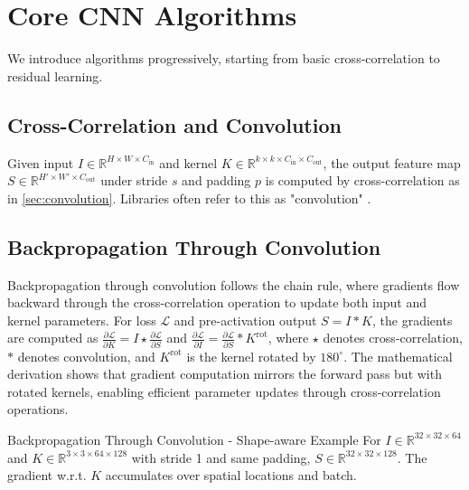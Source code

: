 
\section{Core CNN Algorithms }
\label{sec:cnn-algorithms}

We introduce algorithms progressively, starting from basic cross-correlation to residual learning.

\subsection{Cross-Correlation and Convolution}
Given input $I\in\mathbb{R}^{H\times W\times C_{\text{in}}}$ and kernel $K\in\mathbb{R}^{k\times k\times C_{\text{in}}\times C_{\text{out}}}$, the output feature map $S\in\mathbb{R}^{H'\times W'\times C_{\text{out}}}$ under stride $s$ and padding $p$ is computed by cross-correlation as in \cref{sec:convolution}. Libraries often refer to this as "convolution" \cite{GoodfellowEtAl2016}.

\subsection{Backpropagation Through Convolution}
Backpropagation through convolution follows the chain rule, where gradients flow backward through the cross-correlation operation to update both input and kernel parameters. For loss $\mathcal{L}$ and pre-activation output $S = I * K$, the gradients are computed as $\frac{\partial \mathcal{L}}{\partial K} = I \star \frac{\partial \mathcal{L}}{\partial S}$ and $\frac{\partial \mathcal{L}}{\partial I} = \frac{\partial \mathcal{L}}{\partial S} * K^\text{rot}$, where $\star$ denotes cross-correlation, $*$ denotes convolution, and $K^\text{rot}$ is the kernel rotated by $180^{\circ}$. The mathematical derivation shows that gradient computation mirrors the forward pass but with rotated kernels, enabling efficient parameter updates through cross-correlation operations.\cite{GoodfellowEtAl2016}

\begin{examplebox}{Backpropagation Through Convolution - Shape-aware Example}
For $I\in\mathbb{R}^{32\times32\times 64}$ and $K\in\mathbb{R}^{3\times3\times64\times128}$ with stride 1 and same padding, $S\in\mathbb{R}^{32\times32\times128}$. The gradient w.r.t. $K$ accumulates over spatial locations and batch.
\end{examplebox}


